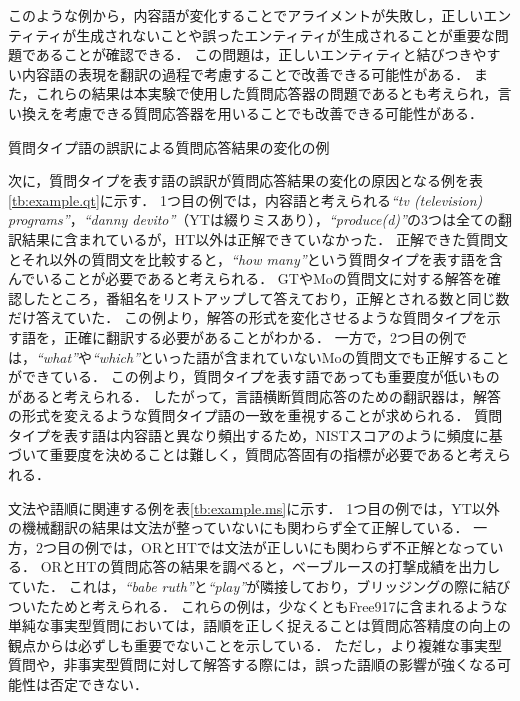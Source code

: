 \documentclass[japanese]{jnlp_1.4}
\begin{document}
このような例から，内容語が変化することでアライメントが失敗し，{正しいエンティティが生成されないことや誤ったエンティティが生成されること}が重要な問題であること{が確認できる}．
{この問題は，正しいエンティティと結びつきやすい内容語の表現を翻訳の過程で考慮することで改善できる可能性がある．}
また，これらの結果は本実験で使用した質問応答器の問題であるとも考えられ，言い換えを考慮できる質問応答器を用いることでも改善できる可能性がある．

\begin{table}[b]
\caption{{質問タイプ語の誤訳による質問応答結果の変化の例}}
\label{tb:example.qt}

\end{table}

次に，質問タイプを表す語の誤訳が質問応答結果の変化の原因となる例を表{\ref{tb:example.qt}}に示す．
1つ目の例では，内容語と考えられる{\it ``tv (television) programs''}，{\it ``danny devito''}（YTは綴りミスあり），{\it ``produce(d)''}の3つは全ての翻訳結果に含まれているが，HT以外は正解できていなかった．
正解できた質問文とそれ以外の質問文を比較すると，{\it ``how many''}という質問タイプを表す語を含んでいることが必要である{と考えられる}．
{GTやMoの質問文に対する解答を確認したところ，番組名をリストアップして答えており，正解とされる数と同じ数だけ答えていた．
この例より，解答の形式を変化させるような質問タイプを示す語を，正確に翻訳する必要があることがわかる．
一方で，2つ目の例では，{\it ``what''}や{\it ``which''}といった語が含まれていないMoの質問文でも正解することができている．
この例より，質問タイプを表す語であっても重要度が低いものがあると考えられる．
したがって，言語横断質問応答のための翻訳器は，解答の形式を変えるような質問タイプ語の一致を重視することが求められる．}
質問タイプを表す語は内容語と異なり頻出するため，NISTスコアのように頻度に基づいて重要度を決めることは難しく，質問応答固有の指標が必要であると考えられる．

文法{や語順}に関連する例を表{\ref{tb:example.ms}}に示す．
1つ目の例では，YT以外の機械翻訳の結果は文法が整っていないにも関わらず全て正解している．
一方，2つ目の例では，ORとHTでは文法が正しいにも関わらず不正解となっている．
ORとHTの質問応答の結果を調べると，ベーブルースの打撃成績を出力していた．
これは，{\it ``babe ruth''}と{\it ``play''}が隣接しており，ブリッジングの際に結びついたためと考えられる．
{これらの例は，少なくともFree917に含まれるような単純な事実型質問においては，語順を正しく捉えることは質問応答精度の向上の観点からは必ずしも重要でないことを示している．
ただし，より複雑な事実型質問や，非事実型質問に対して解答する際には，誤った語順の影響が強くなる可能性は否定できない．}
\end{document}
